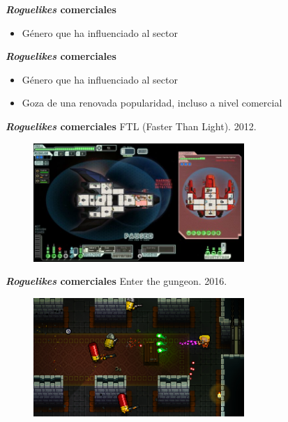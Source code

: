 
\begin{tframe}{\textbf{\textit{Roguelikes} comerciales}}
	\begin{itemize}
		\item<+-| alert@+> Género que ha influenciado al sector
	\end{itemize}
\end{tframe}

\begin{tframe}{\textbf{\textit{Roguelikes} comerciales}}
	\begin{itemize}
		\item Género que ha influenciado al sector
		\item<+-| alert@+> Goza de una renovada popularidad, incluso a nivel comercial
	\end{itemize}
\end{tframe}

\begin{tframe}{\textbf{\textit{Roguelikes} comerciales}}
	FTL (Faster Than Light). 2012.
	\begin{figure}[h]
		\includegraphics[width=8cm]{../img/ftl}
	\end{figure}
\end{tframe}

\begin{tframe}{\textbf{\textit{Roguelikes} comerciales}}
	Enter the gungeon. 2016.
	\begin{figure}[h]
		\includegraphics[width=8cm]{../img/enterthegungeon}
	\end{figure}
\end{tframe}

